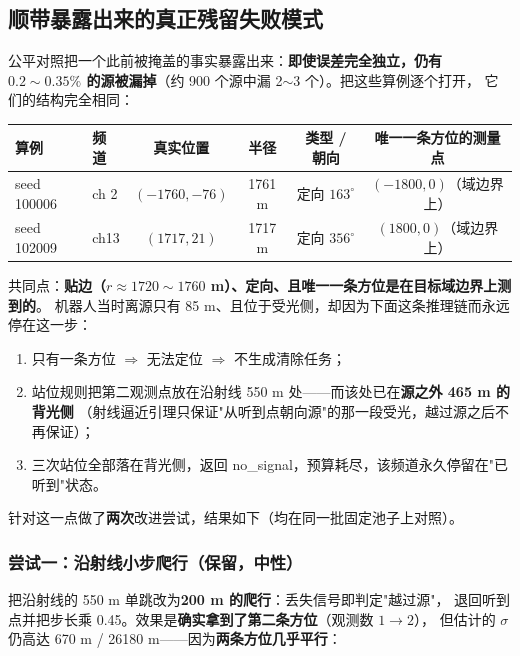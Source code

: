 \subsection{顺带暴露出来的真正残留失败模式}

公平对照把一个此前被掩盖的事实暴露出来：\textbf{即使误差完全独立，仍有
$0.2\sim0.35\%$ 的源被漏掉}（约 900 个源中漏 2$\sim$3 个）。把这些算例逐个打开，
它们的结构完全相同：

\begin{center}
\begin{tabular}{llcccc}
\toprule
算例 & 频道 & 真实位置 & 半径 & 类型 / 朝向 & 唯一一条方位的测量点 \\ \midrule
seed 100006 & ch 2 & $(-1760,-76)$ & 1761 m & 定向 $163^{\circ}$ & $(-1800,0)$（域边界上） \\
seed 102009 & ch13 & $(1717,21)$  & 1717 m & 定向 $356^{\circ}$ & $(1800,0)$（域边界上） \\
\bottomrule
\end{tabular}
\end{center}

共同点：\textbf{贴边（$r\approx1720\sim1760$ m）、定向、且唯一一条方位是在目标域边界上测到的}。
机器人当时离源只有 85 m、且位于受光侧，却因为下面这条推理链而永远停在这一步：

\begin{enumerate}[leftmargin=1.8em]
  \item 只有一条方位 $\Rightarrow$ 无法定位 $\Rightarrow$ 不生成清除任务；
  \item 站位规则把第二观测点放在沿射线 550 m 处——而该处已在\textbf{源之外 465 m 的背光侧}
        （射线逼近引理只保证"从听到点朝向源"的那一段受光，越过源之后不再保证）；
  \item 三次站位全部落在背光侧，返回 no\_signal，预算耗尽，该频道永久停留在"已听到"状态。
\end{enumerate}

针对这一点做了\textbf{两次}改进尝试，结果如下（均在同一批固定池子上对照）。

\subsubsection{尝试一：沿射线小步爬行（保留，中性）}

把沿射线的 550 m 单跳改为\textbf{200 m 的爬行}：丢失信号即判定"越过源"，
退回听到点并把步长乘 0.45。效果是\textbf{确实拿到了第二条方位}（观测数 $1\to2$），
但估计的 $\sigma$ 仍高达 670 m / 26180 m——因为\textbf{两条方位几乎平行}：

